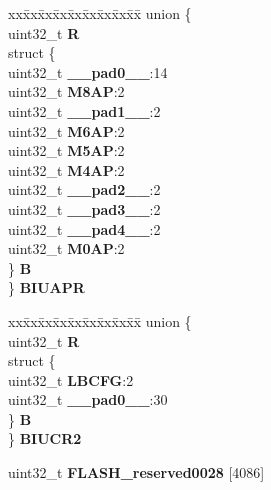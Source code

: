 \begin{DoxyCompactItemize}
\begin{tabbing}
\end{tabbing}\item 
\mbox{\label{structFLASH__tag_addc212a84c390197f4ae6441e3e4954f}} 
\begin{tabbing}
xx\=xx\=xx\=xx\=xx\=xx\=xx\=xx\=xx\=\kill
union \{\\
\>uint32\_t {\bfseries R}\\
\>struct \{\\
\>\>uint32\_t {\bfseries \_\_pad0\_\_}:14\\
\>\>uint32\_t {\bfseries M8AP}:2\\
\>\>uint32\_t {\bfseries \_\_pad1\_\_}:2\\
\>\>uint32\_t {\bfseries M6AP}:2\\
\>\>uint32\_t {\bfseries M5AP}:2\\
\>\>uint32\_t {\bfseries M4AP}:2\\
\>\>uint32\_t {\bfseries \_\_pad2\_\_}:2\\
\>\>uint32\_t {\bfseries \_\_pad3\_\_}:2\\
\>\>uint32\_t {\bfseries \_\_pad4\_\_}:2\\
\>\>uint32\_t {\bfseries M0AP}:2\\
\>\} {\bfseries B}\\
\} {\bfseries BIUAPR}\\

\end{tabbing}\item 
\mbox{\label{structFLASH__tag_a1e9b25895c80c329b85dc360adc0e2f5}} 
\begin{tabbing}
xx\=xx\=xx\=xx\=xx\=xx\=xx\=xx\=xx\=\kill
union \{\\
\>uint32\_t {\bfseries R}\\
\>struct \{\\
\>\>uint32\_t {\bfseries LBCFG}:2\\
\>\>uint32\_t {\bfseries \_\_pad0\_\_}:30\\
\>\} {\bfseries B}\\
\} {\bfseries BIUCR2}\\

\end{tabbing}\item 
\mbox{\label{structFLASH__tag_a196e51c95bb5afe8dfd7ec3ec74057e5}} 
uint32\+\_\+t {\bfseries F\+L\+A\+S\+H\+\_\+reserved0028} \mbox{[}4086\mbox{]}
\end{DoxyCompactItemize}


